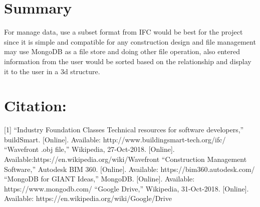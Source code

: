 \documentclass[10pt,letter paper]{article}
\begin{document}
\section*{Summary}
For manage data, use a subset format from IFC would be best for the project since it is simple and compatible for any construction design and file management may use MongoDB as a file store and doing other file operation, also entered information from the user would be sorted based on the relationship and display it to the user in a 3d structure.

\pagebreak
\section*{Citation:}
[1] “Industry Foundation Classes Technical resources for software developers,” buildSmart. [Online].
Available: http://www.buildingsmart-tech.org/ifc/  \newline
[2] “Wavefront .obj file,” Wikipedia, 27-Oct-2018. [Online]. Available:https://en.wikipedia.org/wiki/Wavefront \newline
[3] “Construction Management Software,” Autodesk BIM 360. [Online]. Available: https://bim360.autodesk.com/ \newline
[4] “MongoDB for GIANT Ideas,” MongoDB. [Online]. Available: https://www.mongodb.com/ \newline
[5] “Google Drive,” Wikipedia, 31-Oct-2018. [Online]. Available: https://en.wikipedia.org/wiki/Google/Drive \newline
\end{document}
